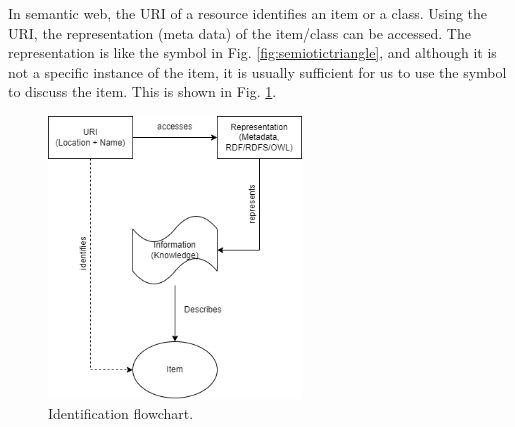In semantic web, the URI of a resource identifies an item or a class. Using the URI, the representation (meta data) of the item/class can be accessed. The representation is like the symbol in Fig. \ref{fig:semiotictriangle}, and although it is not a specific instance of the item, it is usually sufficient for us to use the symbol to discuss the item. This is shown in Fig. \ref{fig:identificationflow}.

\begin{figure}[htbp]
	\centering
	\includegraphics[width=0.6\textwidth]{./chapters/ch-semanticwebarchitecture/figures/identificationflow.png}
	\caption{Identification flowchart.}
	\label{fig:identificationflow}
\end{figure}


